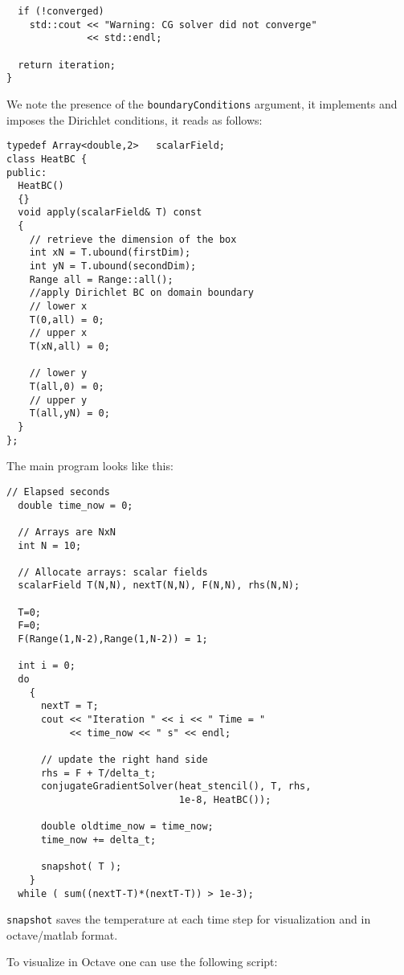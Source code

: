 \documentclass{article}
\begin{document}
\begin{Answer}
\begin{lstlisting}
  if (!converged)
    std::cout << "Warning: CG solver did not converge" 
              << std::endl;

  return iteration;
}
\end{lstlisting}

  We note the presence of the \lstinline!boundaryConditions! argument,
  it implements and imposes  the Dirichlet conditions, it reads as follows:
\begin{lstlisting}
typedef Array<double,2>   scalarField;
class HeatBC {
public:
  HeatBC()
  {}
  void apply(scalarField& T) const
  {
    // retrieve the dimension of the box
    int xN = T.ubound(firstDim);
    int yN = T.ubound(secondDim);
    Range all = Range::all();
    //apply Dirichlet BC on domain boundary
    // lower x
    T(0,all) = 0;
    // upper x
    T(xN,all) = 0;

    // lower y
    T(all,0) = 0;
    // upper y
    T(all,yN) = 0;
  }
};
\end{lstlisting}

The main program looks like this:

\begin{lstlisting}
// Elapsed seconds
  double time_now = 0;

  // Arrays are NxN
  int N = 10;

  // Allocate arrays: scalar fields
  scalarField T(N,N), nextT(N,N), F(N,N), rhs(N,N);

  T=0;
  F=0;
  F(Range(1,N-2),Range(1,N-2)) = 1;

  int i = 0;
  do
    {
      nextT = T;
      cout << "Iteration " << i << " Time = " 
           << time_now << " s" << endl;

      // update the right hand side
      rhs = F + T/delta_t;
      conjugateGradientSolver(heat_stencil(), T, rhs, 
                              1e-8, HeatBC());

      double oldtime_now = time_now;
      time_now += delta_t;

      snapshot( T );
    }
  while ( sum((nextT-T)*(nextT-T)) > 1e-3);
\end{lstlisting}
\lstinline!snapshot! saves the temperature at each time step for
visualization and in octave/matlab format.

To visualize in Octave one can use the following script:

\end{Answer}
\end{document}
